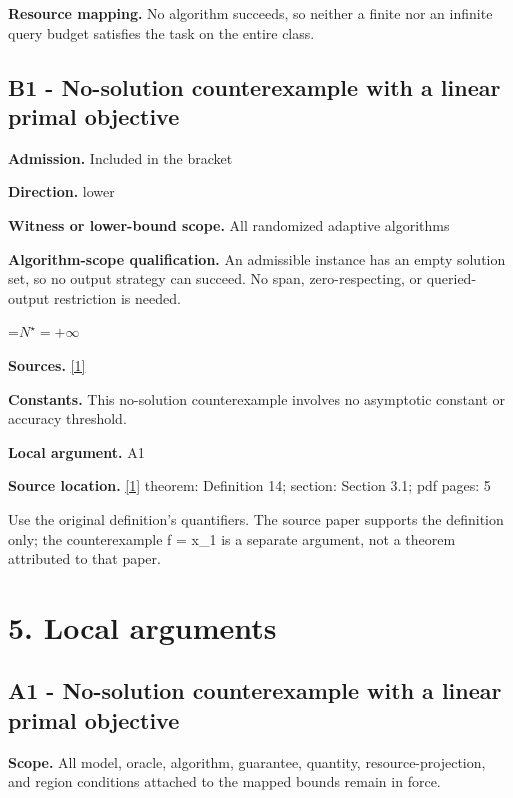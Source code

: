 \documentclass[10pt,a4paper]{article}
\newcommand{\AtlasMath}[1]{\par\begingroup\centering\setbox0=\hbox{$\displaystyle #1$}\ifdim\wd0>1.4\linewidth\typeout{ATLAS WIDE FORMULA: \the\wd0}\fi\ifdim\wd0>\linewidth\resizebox{\linewidth}{!}{\box0}\else\box0\fi\par\endgroup}
\begin{document}
\textbf{Resource mapping.} No algorithm succeeds, so neither a finite nor an infinite query budget satisfies the task on the entire class.

\subsection{B1 - No-solution counterexample with a linear primal objective}
\textbf{Admission.} Included in the bracket

\textbf{Direction.} lower

\textbf{Witness or lower-bound scope.} All randomized adaptive algorithms

\textbf{Algorithm-scope qualification.} An admissible instance has an empty solution set, so no output strategy can succeed. No span, zero-respecting, or queried-output restriction is needed.

\AtlasMath{N^\star=+\infty}
\textbf{Sources.} \href{https://proceedings.mlr.press/v119/jin20e/jin20e.pdf}{[1]}

\textbf{Constants.} This no-solution counterexample involves no asymptotic constant or accuracy threshold.

\textbf{Local argument.} A1

\textbf{Source location.} \href{https://proceedings.mlr.press/v119/jin20e/jin20e.pdf}{[1]} theorem: Definition 14; section: Section 3.1; pdf pages: 5

Use the original definition’s quantifiers. The source paper supports the definition only; the counterexample f = x\_1 is a separate argument, not a theorem attributed to that paper.

\section{5. Local arguments}
\subsection{A1 - No-solution counterexample with a linear primal objective}
\textbf{Scope.} All model, oracle, algorithm, guarantee, quantity, resource-projection, and region conditions attached to the mapped bounds remain in force.
\end{document}
